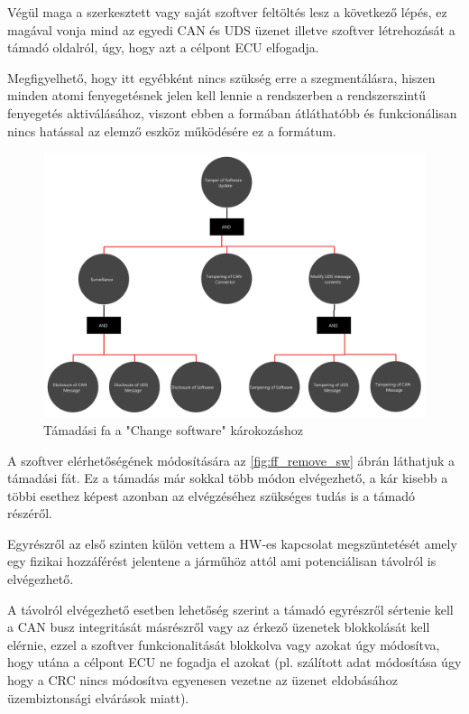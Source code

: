 Végül maga a szerkesztett vagy saját szoftver feltöltés lesz a következő lépés, ez magával vonja mind az egyedi CAN és UDS üzenet illetve szoftver létrehozását a támadó oldalról, úgy, hogy azt a célpont ECU elfogadja.

Megfigyelhető, hogy itt egyébként nincs szükség erre a szegmentálásra, hiszen minden atomi fenyegetésnek jelen kell lennie a rendszerben a rendszerszintű fenyegetés aktiválásához, viszont ebben a formában átláthatóbb és funkcionálisan nincs hatással az elemző eszköz működésére ez a formátum.

\begin{figure}[!ht]
	\centering
	\includegraphics[width=120mm, keepaspectratio]{figures/AT-SECSW-01.png}
	\caption{Támadási fa a "Change software" károkozáshoz} 
	\label{fig:ff_change_sw}
\end{figure}

\newpage

A szoftver elérhetőségének módosítására az \ref{fig:ff_remove_sw} ábrán láthatjuk a támadási fát. Ez a támadás már sokkal több módon elvégezhető, a kár kisebb a többi esethez képest azonban az elvégzéséhez szükséges tudás is a támadó részéről.

Egyrészről az első szinten külön vettem a HW-es kapcsolat megszüntetését amely egy fizikai hozzáférést jelentene a járműhöz attól ami potenciálisan távolról is elvégezhető.

A távolról elvégezhető esetben lehetőség szerint a támadó egyrészről sértenie kell a CAN busz integritását másrészről vagy az érkező üzenetek blokkolását kell elérnie, ezzel a szoftver funkcionalitását blokkolva vagy azokat úgy módosítva, hogy utána a célpont ECU ne fogadja el azokat (pl. szálított adat módosítása úgy hogy a CRC nincs módosítva egyenesen vezetne az üzenet eldobásához üzembiztonsági elvárások miatt).

